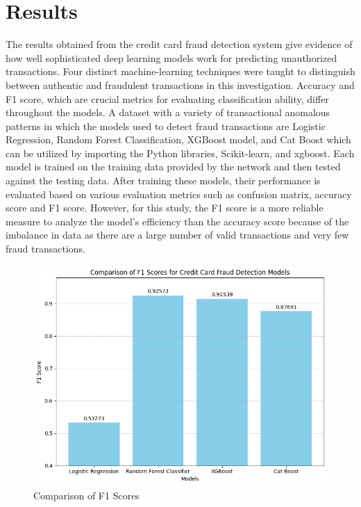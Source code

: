 \chapter{Results}
\label{ch:results}


The results obtained from the credit card fraud detection system give evidence of how well sophisticated deep learning models work for predicting unauthorized transactions. Four distinct machine-learning techniques were taught to distinguish between authentic and fraudulent transactions in this investigation. Accuracy and F1 score, which are crucial metrics for evaluating classification ability, differ throughout the models. A dataset with a variety of transactional anomalous patterns in which the models used to detect fraud transactions are Logistic Regression, Random Forest Classification, XGBoost model, and Cat Boost which can be utilized by importing the Python libraries, Scikit-learn, and xgboost. Each model is trained on the training data provided by the network and then tested against the testing data. After training these models, their performance is evaluated based on various evaluation metrics such as confusion matrix, accuracy score and F1 score. However, for this study, the F1 score is a more reliable measure to analyze the model’s efficiency than the accuracy score because of the imbalance in data as there are a large number of valid transactions and very few fraud transactions. 



 \begin{figure}[ht]
    \centering
    \includegraphics[scale=0.5]{figures/FinalPlot.png}
    \caption{Comparison of F1 Scores}
    \label{fig:Data Preprocessing}
\end{figure}
\clearpage


